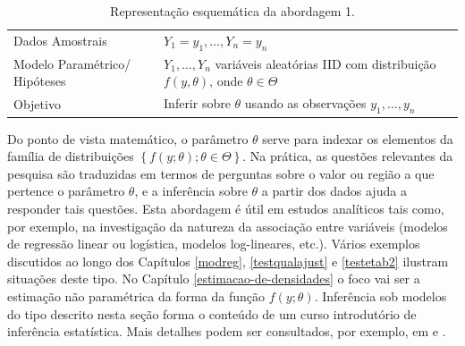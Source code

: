 \documentclass[]{book}
\theoremstyle{definition}
\theoremstyle{definition}
\theoremstyle{definition}
\theoremstyle{remark}
\begin{document}
\begin{longtable}[]{@{}ll@{}}
\caption{\label{tab:modelclass} Representação esquemática da abordagem
1.}\tabularnewline
\toprule
\begin{minipage}[t]{0.29\columnwidth}\raggedright\strut
Dados Amostrais\strut
\end{minipage} & \begin{minipage}[t]{0.60\columnwidth}\raggedright\strut
\(Y_1=y_1,\ldots, Y_n=y_n\)\strut
\end{minipage}\tabularnewline
\begin{minipage}[t]{0.29\columnwidth}\raggedright\strut
Modelo Paramétrico/ Hipóteses\strut
\end{minipage} & \begin{minipage}[t]{0.60\columnwidth}\raggedright\strut
\(Y_1,\ldots,Y_n\) variáveis aleatórias IID com distribuição
\(f(y,\theta)\), onde \(\theta \in \Theta\)\strut
\end{minipage}\tabularnewline
\begin{minipage}[t]{0.29\columnwidth}\raggedright\strut
Objetivo\strut
\end{minipage} & \begin{minipage}[t]{0.60\columnwidth}\raggedright\strut
Inferir sobre \(\theta\) usando as observações \(y_1, \ldots,y_n\)\strut
\end{minipage}\tabularnewline
\bottomrule
\end{longtable}

Do ponto de vista matemático, o parâmetro \(\theta\) serve para indexar
os elementos da família de distribuições
\(\left\{f\left( y;\theta \right);\theta \in \Theta \right\}\). Na
prática, as questões relevantes da pesquisa são traduzidas em termos de
perguntas sobre o valor ou região a que pertence o parâmetro \(\theta\),
e a inferência sobre \(\theta\) a partir dos dados ajuda a responder
tais questões. Esta abordagem é útil em estudos analíticos tais como,
por exemplo, na investigação da natureza da associação entre variáveis
(modelos de regressão linear ou logística, modelos log-lineares, etc.).
Vários exemplos discutidos ao longo dos Capítulos \ref{modreg},
\ref{testqualajust} e \ref{testetab2} ilustram situações deste tipo. No
Capítulo \ref{estimacao-de-densidades} o foco vai ser a estimação não
paramétrica da forma da função \(f(y;\theta)\). Inferência sob modelos
do tipo descrito nesta seção forma o conteúdo de um curso introdutório
de inferência estatística. Mais detalhes podem ser consultados, por
exemplo, em \citep{Casella} e \citep{Marcos}.
\end{document}
